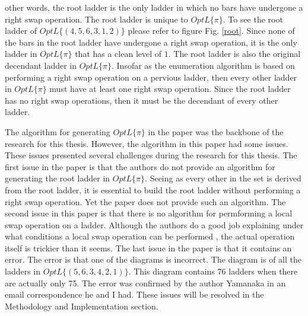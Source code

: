 other words, the root ladder is the only ladder in which no bars have undergone 
a right swap operation. The root ladder is unique to $OptL\{\pi\}$. To see the root ladder 
of $OptL\{(4,5,6,3,1,2)\}$ please refer to figure Fig. \ref{root}. Since none of
the bars in the root ladder have undergone a right swap operation, it is the only 
ladder in $OptL\{\pi\}$ that has a clean level of $1$. The root ladder is
also the original decendant ladder in $OptL\{\pi\}$. Insofar as the enumeration algorithm 
is based on performing a right swap operation on a pervious ladder, then every other 
ladder in $OptL\{\pi\}$ must have at least one right swap operation. Since the root ladder has
no right swap operations, then it must be the decendant of every other ladder.\par 
The algorithm for generating $OptL\{\pi\}$ in the paper was the backbone 
of the research for this thesis. However, the algorithm in this paper had some 
issues. These issues presented several challenges during the research for this thesis.
The first issue in the paper is that the authors do not provide an algorithm for
generating the root ladder in $OptL\{\pi\}$. Seeing as every other in the set 
is derived from the root ladder, it is essential to build the root ladder without
performing a right swap operation. Yet the paper does not provide such an 
algorithm. The second issue in this paper is that there is no algorithm 
for permforming a local swap operation on a ladder. Although the authors 
do a good job explaining under what conditions a local swap operation can 
be performed \cite{A1}, the actual operation itself is trickier than it seems. The last 
issue in the paper is that it contains an error. The error is that one of the diagrams is incorrect. 
The diagram is of all the ladders in $OptL\{(5,6,3,4,2,1)\}$. This diagram contains 76 
ladders when there are actually only 75. The error was confirmed by the author Yamanaka in an 
email correspondence he and I had. These issues will be resolved in the Methodology and Implementation
section.

